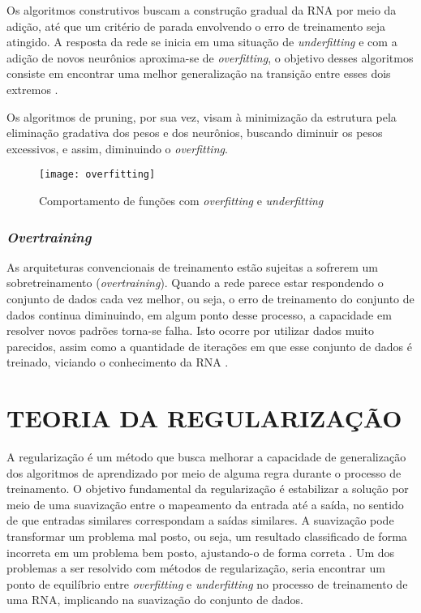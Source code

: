 Os algoritmos construtivos buscam a construção gradual da RNA por meio da adição, até que um critério de parada envolvendo o erro de treinamento seja atingido. A resposta da rede se inicia em uma situação de \textit{underfitting} e com a adição de novos neurônios aproxima-se de \textit{overfitting}, o objetivo desses algoritmos consiste em encontrar uma melhor generalização na transição entre esses dois extremos \cite{medeiros}.

Os algoritmos de pruning, por sua vez, visam à minimização da estrutura pela eliminação gradativa dos pesos e dos neurônios, buscando diminuir os pesos excessivos, e assim, diminuindo o \textit{overfitting}.

\begin{figure}[h]
	\centering
	\texttt{[image: overfitting]}
	\caption{Comportamento de funções com \textit{overfitting} e \textit{underfitting}}
	\label{overfittin-fig}
\end{figure}

\subsubsection{\textit{Overtraining}}
As arquiteturas convencionais de treinamento estão sujeitas a sofrerem um sobretreinamento (\textit{overtraining}). Quando a rede parece estar respondendo o conjunto de dados cada vez melhor, ou seja, o erro de treinamento do conjunto de dados continua diminuindo, em algum ponto desse processo, a capacidade em resolver novos padrões torna-se falha. Isto ocorre por utilizar dados muito parecidos, assim como a quantidade de iterações em que esse conjunto de dados é treinado, viciando o conhecimento da RNA \cite{haykin2000}.

\section{TEORIA DA REGULARIZAÇÃO}\label{regularizacao}
A regularização é um método que busca melhorar a capacidade de generalização dos algoritmos de aprendizado por meio de alguma regra durante o processo de treinamento. O objetivo fundamental da regularização é estabilizar a solução por meio de uma suavização entre o mapeamento da entrada até a saída, no sentido de que entradas similares correspondam a saídas similares. A suavização pode transformar um problema mal posto, ou seja, um resultado classificado de forma incorreta em um problema bem posto, ajustando-o de forma correta \cite{medeiros}. Um dos problemas a ser resolvido com métodos de regularização, seria encontrar um ponto de equilíbrio entre \textit{overfitting} e \textit{underfitting} no processo de treinamento de uma RNA, implicando na suavização do conjunto de dados.

